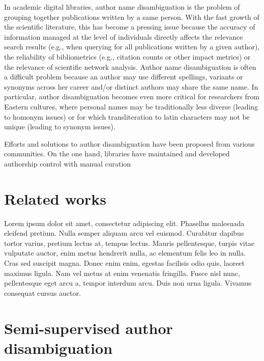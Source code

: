 \documentclass{article}
\begin{document}
In academic digital libraries, author name disambiguation is the problem of
grouping together publications written by a same person.  With the fast growth
of the scientific literature, this has become a pressing issue because the
accuracy of information managed at the level of individuals directly affects
the relevance search results (e.g., when querying for all publications written
by a given author), the reliability of bibliometrics (e.g., citation counts or
other impact metrics) or the relevance of scientific network analysis. Author
name disambiguation is often a difficult problem because an author may use
different spellings, variants or synonyms across her career and/or distinct
authors may share the same name. In particular, author disambiguation becomes
even more critical for researchers from Eastern cultures, where personal names
may be traditionally less diverse (leading to homonym issues) or for which
transliteration to latin characters may not be unique (leading to synonym
issues).

Efforts and solutions to author disambiguation have been proposed from various
communities. On the one hand, libraries have maintained and developed
authorship control with manual curation









\section{Related works}
\label{relate-works}

Lorem ipsum dolor sit amet, consectetur adipiscing elit. Phasellus malesuada
eleifend pretium. Nulla semper aliquam arcu vel euismod. Curabitur dapibus
tortor varius, pretium lectus at, tempus lectus. Mauris pellentesque, turpis
vitae vulputate auctor, enim metus hendrerit nulla, ac elementum felis leo in
nulla. Cras sed suscipit magna. Donec enim enim, egestas facilisis odio quis,
laoreet maximus ligula. Nam vel metus at enim venenatis fringilla. Fusce nisl
nunc, pellentesque eget arcu a, tempor interdum arcu. Duis non urna ligula.
Vivamus consequat cursus auctor.



\section{Semi-supervised author disambiguation}
\label{methods}
\end{document}
